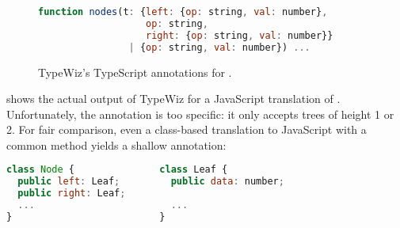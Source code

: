 \begin{figure}
\begin{lstlisting}[language=JavaScript]
function nodes(t: {left: {op: string, val: number},
                   op: string,
                   right: {op: string, val: number}}
                | {op: string, val: number}) ...
\end{lstlisting}
\caption{TypeWiz's TypeScript annotations for .}
\label{fig:infer:typewiz}
\end{figure}

 shows the actual output of TypeWiz for a JavaScript translation of .
Unfortunately, the annotation is too specific: it only accepts trees of height 1 or 2.
For fair comparison, even a class-based translation to JavaScript with
a common  method yields a shallow annotation:
\begin{lstlisting}[language=JavaScript]
class Node {               class Leaf { 
  public left: Leaf;         public data: number;
  public right: Leaf;
  ...                        ...
}                          }
\end{lstlisting}

